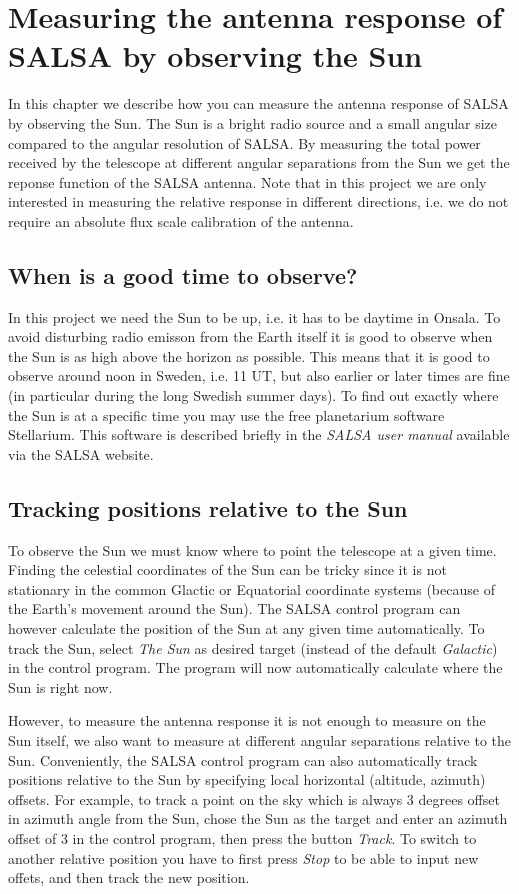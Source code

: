\chapter{Measuring the antenna response of SALSA by observing the Sun}

In this chapter we describe how you can measure the antenna response of SALSA by
observing the Sun. The Sun is a bright radio source and a small angular size compared
to the angular resolution of SALSA. By measuring the total power received
by the telescope at different angular separations from the Sun we get the
reponse function of the SALSA antenna. Note that in this project we are only
interested in measuring the relative response in different directions, i.e.
we do not require an absolute flux scale calibration of the antenna.

\section{When is a good time to observe?}
In this project we need the Sun to be up, i.e. it has to be daytime in Onsala.
To avoid disturbing radio emisson from the Earth itself it is good to observe
when the Sun is as high above the horizon as possible. This means that it is
good to observe around noon in Sweden, i.e. 11 UT, but also earlier or later
times are fine (in particular during the long Swedish summer days). To find out
exactly where the Sun is at a specific time you may use the free planetarium
software Stellarium. This software is described briefly in the \emph{SALSA user
manual} available via the SALSA website.

\section{Tracking positions relative to the Sun}
To observe the Sun we must know where to point the telescope at a given time.
Finding the celestial coordinates of the Sun can be tricky since it is not
stationary in the common Glactic or Equatorial coordinate systems (because of
the Earth's movement around the Sun). The SALSA control program can however
calculate the position of the Sun at any given time automatically. To
track the Sun, select \emph{The Sun} as desired target (instead of the default
\emph{Galactic}) in the control program. The program will now automatically
calculate where the Sun is right now. 

However, to measure the antenna response it is not enough to measure on the Sun
itself, we also want to measure at different angular separations relative to
the Sun. Conveniently, the SALSA control program can also automatically track
positions relative to the Sun by specifying local horizontal (altitude,
azimuth) offsets. For example, to track a point on the sky which is always
3 degrees offset in azimuth angle from the Sun, chose the Sun as the target
and enter an azimuth offset of 3 in the control program, then press the
button \emph{Track}. To switch to another relative position you
have to first press \emph{Stop} to be able to input new offets, and then
track the new position.

